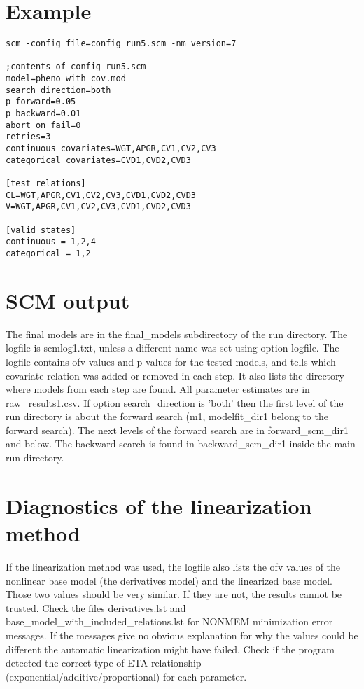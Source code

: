 \section{Example}
\begin{verbatim}
scm -config_file=config_run5.scm -nm_version=7

;contents of config_run5.scm
model=pheno_with_cov.mod
search_direction=both
p_forward=0.05
p_backward=0.01
abort_on_fail=0
retries=3
continuous_covariates=WGT,APGR,CV1,CV2,CV3
categorical_covariates=CVD1,CVD2,CVD3

[test_relations]
CL=WGT,APGR,CV1,CV2,CV3,CVD1,CVD2,CVD3
V=WGT,APGR,CV1,CV2,CV3,CVD1,CVD2,CVD3

[valid_states]
continuous = 1,2,4
categorical = 1,2
\end{verbatim}

\section{SCM output}
The final models are in the final\_models subdirectory of the run directory. The logfile is scmlog1.txt, unless a different name was set using option logfile. The logfile contains ofv-values and p-values for the tested models, and tells which covariate relation was added or removed in each step. It also lists the directory where models from each step are found. All parameter estimates are in raw\_results1.csv. If option search\_direction is 'both' then the first level of the run directory is about the forward search (m1, modelfit\_dir1 belong to the forward search). The next levels of the forward search are in forward\_scm\_dir1 and below. The backward search is found in backward\_scm\_dir1 inside the main run directory.  


\section{Diagnostics of the linearization method}
If the linearization method was used, the logfile also lists the ofv values of the nonlinear base model (the derivatives model) and the linearized base model. Those two values should be very similar. If they are not, the results cannot be trusted. Check the files derivatives.lst and base\_model\_with\_included\_relations.lst for NONMEM minimization error messages. If the messages give no obvious explanation for why the values could be different the automatic linearization might have failed. Check if the program detected the correct type of ETA relationship (exponential/additive/proportional) for each parameter. 

